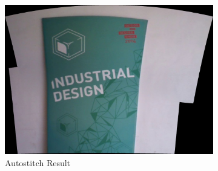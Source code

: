 \begin{figure}
\begin{subfigure}[b]{0.3\textwidth}
\includegraphics[width=\linewidth]{figures/idc_indoor/autostitch.jpg}
\caption{Autostitch Result}
\end{subfigure}
\begin{subfigure}[b]{0.3\textwidth}

\end{subfigure}
\end{figure}
